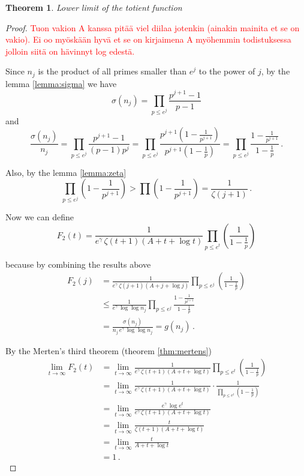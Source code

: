 \documentclass{article}
\theoremstyle{definition}
\newtheorem{theorem}[subsubsection]{Theorem}
\begin{document}
\begin{theorem}{\emph{Lower limit of the totient function}}
\begin{proof}
\textcolor{red}{Tuon vakion A kanssa pitää viel diilaa jotenkin (ainakin mainita et se on vakio). Ei oo myöskään hyvä et se on kirjaimena A myöhemmin todistuksessa jolloin siitä on hävinnyt log edestä.}

Since $n_j$ is the product of all primes smaller than $e^j$ to the power of $j$, by the lemma \ref{lemma:sigma} we have
\begin{equation*}
    \sigma(n_j) = \prod_{p\leq e^j} \frac{p^{j+1}-1}{p-1}
\end{equation*}
and
\begin{equation*}
    \frac{\sigma(n_j)}{n_j} = \prod_{p\leq e^j} \frac{p^{j+1}-1}{(p-1)p^j} = \prod_{p\leq e^j} \frac{p^{j+1}\left(1-\frac{1}{p^{j+1}}\right)}{p^{j+1}\left(1-\frac{1}{p}\right)} = \prod_{p\leq e^j} \frac{1-\frac{1}{p^{j+1}}}{1-\frac{1}{p}}\,.
\end{equation*}

Also, by the lemma \ref{lemma:zeta}
\begin{equation*}
    \prod_{p\leq e^j}\left(1-\frac{1}{p^{j+1}}\right) > \prod \left(1-\frac{1}{p^{j+1}}\right) = \frac{1}{\zeta(j+1)}\,.
\end{equation*}

Now we can define
\begin{equation*}
    F_2(t)=\frac{1}{e^\gamma\,\zeta(t+1)(A+t+\log t)} \prod_{p\leq e^t} \left(\frac{1}{1-\frac{1}{p}}\right)
\end{equation*}

because by combining the results above
\begin{align*}
    F_2(j)& = \frac{1}{e^\gamma\,\zeta(j+1)(A+j+\log j)} \prod_{p\leq e^j} \left(\frac{1}{1-\frac{1}{p}}\right)\\
    & \leq \frac{1}{e^\gamma\,\log \log n_j} \prod_{p\leq e^j} \frac{1-\frac{1}{p^{j+1}}}{1-\frac{1}{p}}\\
    & = \frac{\sigma(n_j)}{n_j\,e^\gamma\,\log \log n_j} = g(n_j)\,.
\end{align*}

By the Merten's third theorem (theorem \ref{thm:mertens})
\begin{align*}
    \lim_{t \rightarrow \infty} F_2(t) & = \lim_{t \rightarrow \infty} \frac{1}{e^\gamma\,\zeta(t+1)(A+t+\log t)} \prod_{p\leq e^t} \left(\frac{1}{1-\frac{1}{p}}\right)\\
    & = \lim_{t \rightarrow \infty} \frac{1}{e^\gamma\,\zeta(t+1)(A+t+\log t)} \cdot \frac{1}{\prod_{p\leq e^t} \left(1-\frac{1}{p}\right)}\\
    & = \lim_{t \rightarrow \infty} \frac{e^\gamma\,\log e^t}{e^\gamma\,\zeta(t+1)(A+t+\log t)}\\
    & = \lim_{t \rightarrow \infty} \frac{t}{\zeta(t+1)(A+t+\log t)}\\
    & = \lim_{t \rightarrow \infty} \frac{t}{A+t+\log t}\\
    & = 1\,.
\end{align*}


\end{proof}
\end{theorem}
\end{document}
